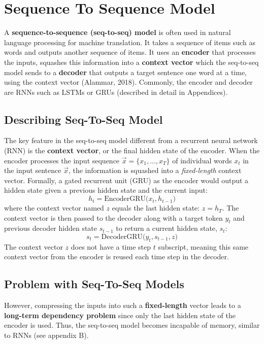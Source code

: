 \section{Sequence To Sequence Model}

A \textbf{sequence-to-sequence (seq-to-seq) model} is often used in natural language processing for machine translation. It takes a sequence of items such as words and outputs another sequence of items. It uses an \textbf{encoder} that processes the inputs, squashes this information into a \textbf{context vector} which the seq-to-seq model sends to a \textbf{decoder} that outputs a target sentence one word at a time, using the context vector (Alammar, 2018). Commonly, the encoder and decoder are RNNs such as LSTMs or GRUs (described in detail in Appendices).


\subsection{Describing Seq-To-Seq Model}

The key feature in the seq-to-seq model different from a recurrent neural network (RNN) is the \textbf{context vector}, or the final hidden state of the encoder. When the encoder processes the input sequence $\overrightarrow{x} = \{x_1, ..., x_T \}$ of individual words $x_t$ in the input sentence $\overrightarrow{x}$, the information is squashed into a \emph{fixed-length} context vector. Formally, a gated recurrent unit (GRU) as the encoder would output a hidden state given a previous hidden state and the current input: 
$$
h_t = \text{EncoderGRU} \Big( x_t, h_{t-1} \Big)
$$ 
where the context vector named $z$ equals the last hidden state: $z = h_T$. 
\newline 
The context vector is then passed to the decoder along with a target token $y_t$ and previous decoder hidden state $s_{t-1}$ to return a current hidden state, $s_t$:
$$
s_t = \text{DecoderGRU} \Big( y_t, s_{t-1}, z \Big)
$$
The context vector $z$ does not have a time step $t$ subscript, meaning this same context vector from the encoder is reused each time step in the decoder. 


\subsection{Problem with Seq-To-Seq Models}

However, compressing the inputs into such a \textbf{fixed-length} vector leads to a \textbf{long-term dependency problem} since only the last hidden state of the encoder is used. Thus, the seq-to-seq model becomes incapable of memory, similar to RNNs (see appendix B). 

